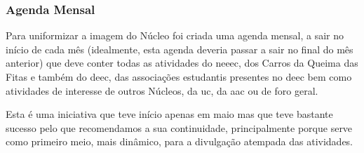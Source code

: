 
\subsubsection{Agenda Mensal}

Para uniformizar a imagem do Núcleo foi criada uma agenda mensal, a sair no início de cada mês (idealmente, esta agenda deveria passar a sair no final do mês anterior) que deve conter todas as atividades do \acrshort{neeec}, dos Carros da Queima das Fitas e também do \acrshort{deec}, das associações estudantis presentes no \acrshort{deec} bem como atividades de interesse de outros Núcleos, da \acrshort{uc}, da \acrshort{aac} ou de foro geral.

Esta é uma iniciativa que teve início apenas em maio mas que teve bastante sucesso pelo que recomendamos a sua continuidade, principalmente porque serve como primeiro meio, mais dinâmico, para a divulgação atempada das atividades.